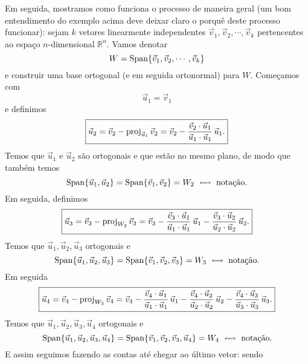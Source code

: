 \documentclass[../livro.tex]{subfiles}  %
\begin{document}
Em seguida, mostramos como funciona o processo de maneira geral (um bom entendimento do exemplo acima deve deixar claro o porquê deste processo funcionar): sejam $k$ vetores linearmente independentes $\vec{v}_1, \vec{v}_2, \cdots, \vec{v}_k$ pertencentes ao espaço $n$-dimensional $\mathbb{R}^n$. Vamos denotar
\begin{equation}
W = \operatorname{Span} \{\vec{v}_1, \vec{v}_2, \cdots, \vec{v}_k\}
\end{equation} e construir uma base ortogonal (e em seguida ortonormal) para $W$. Começamos com
\begin{equation}
\boxed{\vec{u}_1 = \vec{v}_1}
\end{equation} e definimos
\begin{equation}\label{eqn:Gram-Schmidt-1}
\boxed{\vec{u}_2 = \vec{v}_2 - \operatorname{proj}_{\vec{u}_1} \vec{v}_2 = \vec{v}_2 - \frac{\vec{v}_2 \cdot \vec{u}_1}{\vec{u}_1 \cdot \vec{u}_1} \, \vec{u}_1.}
\end{equation}
 Temos que $\vec{u}_1$ e $\vec{u}_2$ são ortogonais e que estão no mesmo plano, de modo que também temos
\begin{equation}
\operatorname{Span} \{ \vec{u}_1, \vec{u}_2 \} = \operatorname{Span} \{ \vec{v}_1, \vec{v}_2 \} = W_2 \ \leftrightsquigarrow \text{ notação.}
\end{equation} Em seguida, definimos
\begin{equation}\label{eqn:Gram-Schmidt-2}
\boxed{\vec{u}_3 = \vec{v}_3 - \operatorname{proj}_{W_2} \vec{v}_3 = \vec{v}_3 - \frac{\vec{v}_3 \cdot \vec{u}_1}{\vec{u}_1 \cdot \vec{u}_1} \, \vec{u}_1 - \frac{\vec{v}_3 \cdot \vec{u}_2}{\vec{u}_2 \cdot \vec{u}_2} \, \vec{u}_2.}
\end{equation} Temos que $\vec{u}_1, \vec{u}_2, \vec{u}_3$ ortogonais e
\begin{equation}
\Span \{ \vec{u}_1, \vec{u}_2, \vec{u}_3 \} = \Span \{ \vec{v}_1, \vec{v}_2, \vec{v}_3 \} = W_3 \ \leftrightsquigarrow \text{ notação.}
\end{equation} Em seguida
\begin{equation}
\boxed{\vec{u}_4 = \vec{v}_4 - \operatorname{proj}_{W_3} \vec{v}_4 = \vec{v}_4 - \frac{\vec{v}_4 \cdot \vec{u}_1}{\vec{u}_1 \cdot \vec{u}_1} \, \vec{u}_1 - \frac{\vec{v}_4 \cdot \vec{u}_2}{\vec{u}_2 \cdot \vec{u}_2} \, \vec{u}_2 - \frac{\vec{v}_4 \cdot \vec{u}_3}{\vec{u}_3 \cdot \vec{u}_3} \, \vec{u}_3.}
\end{equation} Temos que $\vec{u}_1, \vec{u}_2, \vec{u}_3, \vec{u}_4$ ortogonais e
\begin{equation}
\operatorname{Span} \{ \vec{u}_1, \vec{u}_2, \vec{u}_3, \vec{u}_4 \} = \operatorname{Span} \{ \vec{v}_1, \vec{v}_2, \vec{v}_3, \vec{u}_4 \} = W_4 \ \leftrightsquigarrow \text{ notação.}
\end{equation} E assim seguimos fazendo as contas até chegar ao último vetor: sendo
\end{document}
